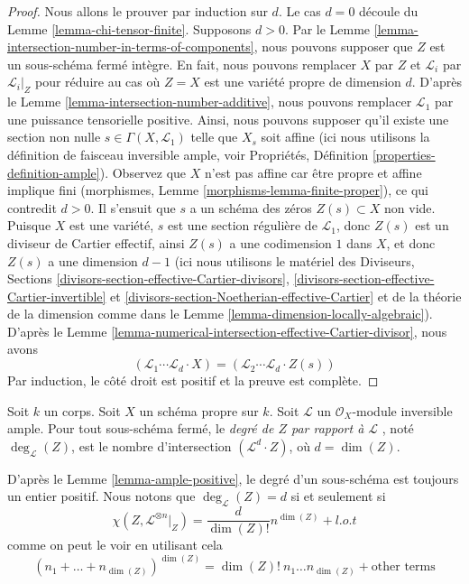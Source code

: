 \begin{proof}
Nous allons le prouver par induction sur $d$. Le cas $d = 0$
découle du Lemme \ref{lemma-chi-tensor-finite}. Supposons $d
> 0$. Par le Lemme
\ref{lemma-intersection-number-in-terms-of-components}, nous
pouvons supposer que $Z$ est un sous-schéma fermé intègre. En
fait, nous pouvons remplacer $X$ par $Z$ et $\mathcal{L}_i$
par $\mathcal{L}_i|_Z$ pour réduire au cas où $Z = X$ est une
variété propre de dimension $d$. D'après le Lemme
\ref{lemma-intersection-number-additive}, nous pouvons
remplacer $\mathcal{L}_1$ par une puissance tensorielle
positive. Ainsi, nous pouvons supposer qu'il existe une section
non nulle $s \in \Gamma(X, \mathcal{L}_1)$ telle que $X_s$ soit
affine (ici nous utilisons la définition de faisceau inversible
ample, voir Propriétés, Définition
\ref{properties-definition-ample}). Observez que $X$ n'est pas
affine car être propre et affine implique fini (morphismes, Lemme
\ref{morphisms-lemma-finite-proper}), ce qui contredit $d > 0$. Il
s'ensuit que $s$ a un schéma des zéros $Z(s) \subset X$ non vide.
Puisque $X$ est une variété, $s$ est une section régulière de
$\mathcal{L}_1$, donc $Z(s)$ est un diviseur de Cartier effectif,
ainsi $Z(s)$ a une codimension $1$ dans $X$, et donc $Z(s)$ a une
dimension $d - 1$ (ici nous utilisons le matériel des Diviseurs,
Sections \ref{divisors-section-effective-Cartier-divisors},
\ref{divisors-section-effective-Cartier-invertible} et
\ref{divisors-section-Noetherian-effective-Cartier} et de la théorie de la
dimension comme dans le Lemme \ref{lemma-dimension-locally-algebraic}). D'après
le Lemme \ref{lemma-numerical-intersection-effective-Cartier-divisor}, nous avons
$$
(\mathcal{L}_1 \cdots \mathcal{L}_d \cdot X) =
(\mathcal{L}_2 \cdots \mathcal{L}_d \cdot Z(s))
$$
Par induction, le côté droit est positif et la preuve est complète.
\end{proof}

\begin{definition}
\label{definition-degree}
Soit $k$ un corps. Soit $X$ un schéma propre sur
$k$. Soit $\mathcal{L}$ un $\mathcal{O}_X$-module
inversible ample. Pour tout sous-schéma fermé, le
{\it degré de $Z$ par rapport à $\mathcal{L}$ },
noté $\deg_\mathcal{L}(Z)$, est le nombre
d'intersection $(\mathcal{L}^d \cdot Z)$, où $d = \dim(Z)$.
\end{definition}

\noindent
D'après le Lemme \ref{lemma-ample-positive}, le degré d'un sous-schéma est
toujours un entier positif. Nous notons que $\deg_\mathcal{L}(Z) = d$ si et seulement si
$$
\chi(Z, \mathcal{L}^{\otimes n}|_Z) = \frac{d}{\dim(Z)!} n^{\dim(Z)} + l.o.t
$$
comme on peut le voir en utilisant cela
$$
(n_1 + \ldots + n_{\dim(Z)})^{\dim(Z)} =
\dim(Z)!\ n_1 \ldots n_{\dim(Z)} + \text{other terms}
$$

